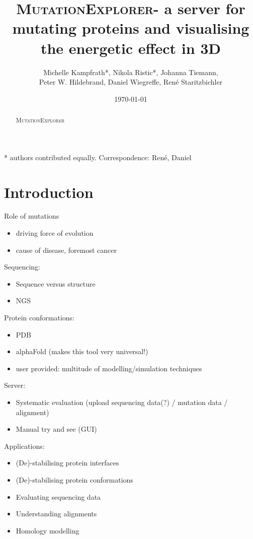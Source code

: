 \documentclass[11pt]{article}
\newcommand{\ME}{\textsc{MutationExplorer}}
\begin{document}
\title{\ME - a server for mutating proteins and visualising the energetic effect in 3D}
\author{ Michelle Kampfrath*, Nikola Ristic*,  Johanna Tiemann, \\Peter W. Hildebrand, Daniel Wiegreffe, René Staritzbichler}
\date{\today}
\maketitle

\noindent
* authors contributed equally.
Correspondence: René, Daniel

\begin{abstract}
 \ME
\end{abstract}

\section*{Introduction}

Role of mutations
\begin{itemize}
\item driving force of evolution
\item cause of disease, foremost cancer
\end{itemize}


\noindent
Sequencing:
\begin{itemize}
\item Sequence versus structure
\item NGS
\end{itemize}


\noindent
Protein conformations: 
\begin{itemize}
\item PDB
\item alphaFold (makes this tool very universal!)
\item user provided: multitude of modelling/simulation techniques
\end{itemize}


\clearpage

\noindent
Server:
\begin{itemize}
\item Systematic evaluation (upload sequencing data(?) / mutation data / alignment)
\item Manual try and see (GUI)
\end{itemize}


\noindent
Applications:
\begin{itemize}
\item (De)-stabilising protein interfaces
\item (De)-stabilising protein conformations
\item Evaluating sequencing data
\item Understanding alignments
\item Homology modelling
\end{itemize}
\end{document}
